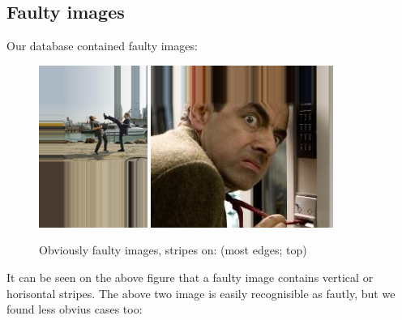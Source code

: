 \documentclass[12pt]{article}
\begin{document}
\subsection{Faulty images}
Our database contained faulty images:
\begin{figure}[H]
	\centering
	\captionsetup{justification=centering}
	\includegraphics[height=150pt]{faulty1}
	\hspace{60pt}
	\includegraphics[height=150pt]{faulty2}
	\caption{Obviously faulty images, stripes on: (most edges; top)}	
	\label{fig:stripe_obv}
\end{figure}
\noindent It can be seen on the above figure that a faulty image contains vertical or horisontal stripes. The above two image is easily recognisible as fautly, but we found less obvius cases too:
\end{document}
